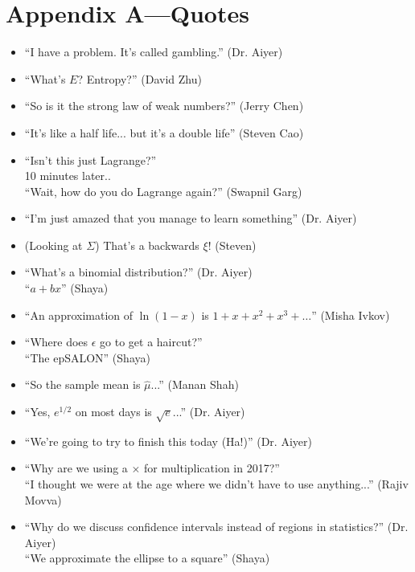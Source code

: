 \documentclass[11pt]{article}
\theoremstyle{definition}
\begin{document}
\section*{Appendix A---Quotes}
\begin{itemize}
\item ``I have a problem. It's called gambling.'' (Dr. Aiyer)
\item ``What's $E$? Entropy?'' (David Zhu)
\item ``So is it the strong law of weak numbers?'' (Jerry Chen)
\item ``It's like a half life... but it's a double life'' (Steven Cao)
\item ``Isn't this just Lagrange?''  \\ 10 minutes later.. \\ ``Wait, how do you do Lagrange again?'' (Swapnil Garg)
\item ``I'm just amazed that you manage to learn something'' (Dr. Aiyer)
\item (Looking at $\Sigma$) That's a backwards $\xi$! (Steven)
\item ``What's a binomial distribution?'' (Dr. Aiyer) \\ ``$a + bx$'' (Shaya)
\item ``An approximation of $\ln(1-x)$ is $1 + x + x^2 + x^3 + \dots$'' (Misha Ivkov)
\item ``Where does $\epsilon$ go to get a haircut?'' \\ ``The epSALON'' (Shaya)
\item ``So the sample mean is $\hat{\mu}$...'' (Manan Shah)
\item ``Yes, $e^{1/2}$ on most days is $\sqrt{e}$...'' (Dr. Aiyer)
\item ``We're going to try to finish this today (Ha!)'' (Dr. Aiyer)
\item ``Why are we using a $\times$ for multiplication in 2017?'' \\ ``I thought we were at the age where we didn't have to use anything...'' (Rajiv Movva)
\item ``Why do we discuss confidence intervals instead of regions in statistics?'' (Dr. Aiyer) \\ ``We approximate the ellipse to a square'' (Shaya)
\end{itemize}
\end{document}
